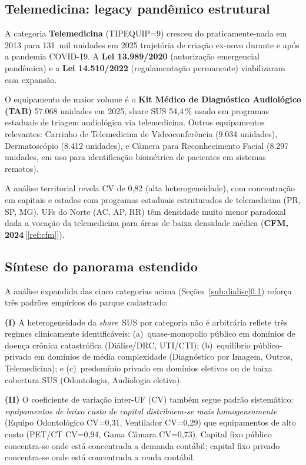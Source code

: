 \documentclass[12pt,a4paper,oneside]{article}
\begin{document}
\subsection{Telemedicina: legacy pandêmico
estrutural}\label{sub:telemedicina}

A categoria \textbf{Telemedicina} (TIPEQUIP=9) cresceu do
praticamente-nada em 2013 para 131~mil unidades em 2025 \textemdash{}
trajetória de criação ex-novo durante e após a pandemia COVID-19.
A \textbf{Lei 13.989/2020} (autorização emergencial pandêmica) e a
\textbf{Lei 14.510/2022} (regulamentação permanente) viabilizaram
essa expansão.

O equipamento de maior volume é o \textbf{Kit Médico de Diagnóstico
Audiológico (TAB)} \textendash{} 57.068 unidades em 2025, share SUS
54,4\,\% \textemdash{} usado em programas estaduais de triagem
audiológica via telemedicina. Outros equipamentos relevantes:
Carrinho de Telemedicina de Videoconferência (9.034 unidades),
Dermatoscópio (8.412 unidades), e Câmera para Reconhecimento
Facial (8.297 unidades, em uso para identificação biométrica de
pacientes em sistemas remotos).

A análise territorial revela CV de 0,82 (alta heterogeneidade),
com concentração em capitais e estados com programas estaduais
estruturados de telemedicina (PR, SP, MG). UFs do Norte (AC, AP, RR)
têm densidade muito menor \textemdash{} paradoxal dada a vocação
da telemedicina para áreas de baixa densidade médica
(\textbf{CFM, 2024}\,[\ref{ref:cfm}]).

\subsection{Síntese do panorama estendido}

A análise expandida das cinco categorias acima
(Seções~\ref{sub:dialise}\textendash\ref{sub:telemedicina}) reforça
três padrões empíricos do parque cadastrado:

\textbf{(I)} A heterogeneidade da \textit{share}~SUS por categoria
não é arbitrária \textemdash{} reflete três regimes
clinicamente identificáveis: (a)~quase-monopolio público em
domínios de doença crônica catastrófica (Diálise/DRC, UTI/CTI);
(b)~equilíbrio público-privado em domínios de média complexidade
(Diagnóstico por Imagem, Outros, Telemedicina); e (c)~predomínio
privado em domínios eletivos ou de baixa cobertura SUS
(Odontologia, Audiologia eletiva).

\textbf{(II)} O coeficiente de variação inter-UF (CV) também segue
padrão sistemático: \textit{equipamentos de baixo custo de capital
distribuem-se mais homogeneamente} (Equipo Odontológico CV=0,31,
Ventilador CV=0,29) que equipamentos de alto custo
(PET/CT CV=0,94, Gama Câmara CV=0,73). Capital fixo público
concentra-se onde está concentrada a demanda contábil; capital
fixo privado concentra-se onde está concentrada a renda contábil.
\end{document}
